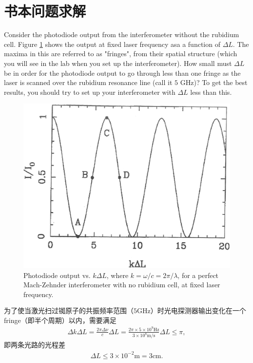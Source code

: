 \documentclass{assignment}
\begin{document}
\section{书本问题求解}
\begin{prob}
    Consider the photodiode output from the interferometer without the rubidium cell. Figure \ref{InterferometricOutputWithoutRbCell} shows the output at fixed laser frequency asa a function of $\Delta L$. The maxima in this are referred to as "fringes", from their spatial structure (which you will see in the lab when you set up the interferometer). How small must $\Delta L$ be in order for the photodiode output to go through less than one fringe as the laser is scanned over the rubidium resonance line (call it $5$ GHz)? To get the best results, you should try to set up your interferometer with $\Delta L$ less than this.
    \begin{figure}[h]
        \centering
        \includegraphics[width=.5\textwidth]{InterferometricOutputWithoutRbCell.png}
        \caption{Photodiode output vs. $k\Delta L$, where $k=\omega/c=2\pi/\lambda$, for a perfect Mach-Zehnder interferometer with no rubidium cell, at fixed laser frequency.}
        \label{InterferometricOutputWithoutRbCell}
    \end{figure}
\end{prob}
\begin{sol}
    为了使当激光扫过铷原子的共振频率范围（$5$GHz）时光电探测器输出变化在一个fringe（即半个周期）以内，需要满足
    \begin{align}
        \Delta k\Delta L=\frac{2\pi\Delta\nu}{c}\Delta L=\frac{2\pi\times 5\times 10^9\text{Hz}}{3\times 10^8\text{m/s}}\Delta L\leq\pi,
    \end{align}
    即两条光路的光程差
    \begin{align}
        \Delta L\leq 3\times 10^{-2}\text{m}=3\text{cm}.
    \end{align}
\end{sol}
\end{document}
